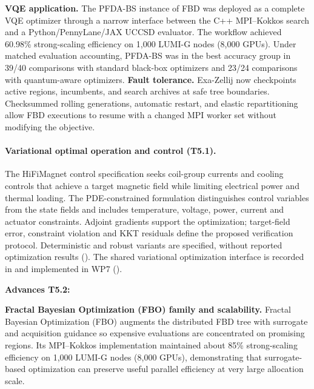 \textbf{VQE application.}
The PFDA-BS instance of FBD was deployed as a complete VQE optimizer through a narrow interface between the C++ MPI--Kokkos search and a Python/PennyLane/JAX UCCSD evaluator. The workflow achieved 60.98\% strong-scaling efficiency on 1,000 LUMI-G nodes (8,000 GPUs). Under matched evaluation accounting, PFDA-BS was in the best accuracy group in 39/40 comparisons with standard black-box optimizers and 23/24 comparisons with quantum-aware optimizers.
\textbf{Fault tolerance.}
Exa-Zellij now checkpoints active regions, incumbents, and search archives at safe tree boundaries. Checksummed rolling generations, automatic restart, and elastic repartitioning allow FBD executions to resume with a changed MPI worker set without modifying the objective.

\medskip

\paragraph{Variational optimal operation and control (T5.1).}
The HiFiMagnet control specification seeks coil-group currents and cooling
controls that achieve a target magnetic field while limiting electrical
power and thermal loading. The PDE-constrained formulation distinguishes
control variables from the state fields and includes temperature,
voltage, power, current and actuator constraints. Adjoint gradients
support the optimization; target-field error, constraint violation and KKT
residuals define the proposed verification protocol. Deterministic and
robust variants are specified, without reported optimization results
().
The shared variational optimization interface is recorded in
 and implemented in WP7
().

{\bf Advances T5.2:}

\textbf{Fractal Bayesian Optimization (FBO) family and scalability.}
Fractal Bayesian Optimization (FBO) augments the distributed FBD tree with surrogate and acquisition guidance so expensive evaluations are concentrated on promising regions. Its MPI--Kokkos implementation maintained about 85\% strong-scaling efficiency on 1,000 LUMI-G nodes (8,000 GPUs), demonstrating that surrogate-based optimization can preserve useful parallel efficiency at very large allocation scale.


